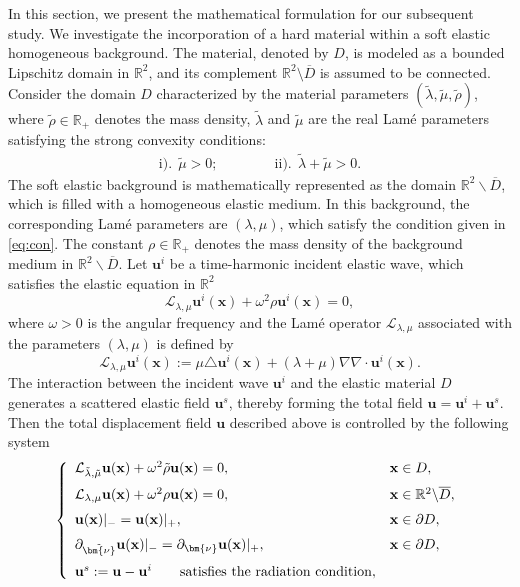 \documentclass[11pt,reqno,twoside]{amsart}
\theoremstyle{definition}
\theoremstyle{remark}
\numberwithin{equation}{section}
\newcommand{\bu}{\mathbf{u}}
\newcommand{\bnu}{\bm{\nu}}
\newcommand{\bx}{\mathbf{x}}
\newcommand{\td}{\tilde}
\newcommand{\Lcal}{\mathcal{L}}
\begin{document}
In this section, we present the mathematical formulation for our subsequent study. We investigate the incorporation of a hard material within a soft elastic homogeneous background. The material, denoted by \( D \), is modeled as a bounded Lipschitz domain in \( \mathbb{R}^2 \), and its complement \( \mathbb{R}^2 \setminus \overline{D} \) is assumed to be connected. Consider the domain \( D \) characterized by the material parameters \( (\tilde{\lambda}, \tilde{\mu}, \tilde{\rho}) \), where \( \tilde{\rho} \in \mathbb{R}_{+} \) denotes the mass density, \( \tilde{\lambda} \) and \( \tilde{\mu} \) are the real  Lam\'e parameters  satisfying the strong convexity conditions:
\begin{align}\label{eq:con}
	\mathrm{i)}.~~\td{\mu}>0;\qquad\qquad \mathrm{ii)}.~~\td{\lambda}+\td{\mu}>0.
\end{align}
The soft elastic background is mathematically represented as the domain $\mathbb{R}^2\backslash\overline{D}$, which is filled with a homogeneous elastic medium. In this background, the corresponding Lam\'e parameters are $(\lambda, \mu)$, which satisfy the condition given in \eqref{eq:con}. The constant $\rho \in \mathbb{R}_{+}$ denotes the mass density of the background medium in $\mathbb{R}^2\backslash\overline{D}$.
Let $\bu^i$ be a time-harmonic incident elastic wave, which satisfies the elastic equation in  $\mathbb{R}^2$
\begin{equation}\label{eq:inci}
	\mathcal{L}_{ {\lambda}, {\mu}}\bu^i(\bx) + \omega^2  {\rho} \bu^i(\bx) =0,
\end{equation}
where $\omega>0$ is the angular  frequency and the Lam\'e operator $ \mathcal{L}_{\lambda, \mu}$ associated with the parameters $(\lambda,\mu)$ is defined by 
\begin{equation}\label{op:lame}
	\Lcal_{\lambda,\mu}\bu^i(\bx):=\mu \triangle\bu^i(\bx) + (\lambda+ \mu)\nabla\nabla\cdot\bu^i(\bx).
\end{equation}
The interaction between the incident wave \( \bu^i \) and the elastic material \( D \) generates a scattered elastic field \( \bu^s \), thereby forming the total  field \(\bu = \bu^i + \bu^s.\)
Then the total displacement field $\bu$ described above is controlled by the following system
\begin{equation}\label{eq:xtm}
	\left\{
	\begin{array}{ll}
		\mathcal{L}_{\td{\lambda}, \td{\mu}}\bu(\bx) + \omega^2 \td{\rho} \bu(\bx) =0,  &  \bx\in D,  \medskip \\
		\mathcal{L}_{\lambda, \mu}\bu(\bx) + \omega^2\rho\bu(\bx) =0,   &   \bx\in \mathbb{R}^2\backslash \overline{D},  \medskip \\
		\bu(\bx)|_- = \bu(\bx)|_+,     & \bx\in\partial D,  \medskip \\
		\partial_{\td{\bnu}}\bu(\bx)|_- = \partial_{{\bnu}}\bu(\bx)|_+, & \bx\in\partial D,  \medskip \\
		\bu^s:=\bu-\bu^i  \qquad \mbox{satisfies the radiation condition},
	\end{array}
	\right.
\end{equation} 
\end{document}

